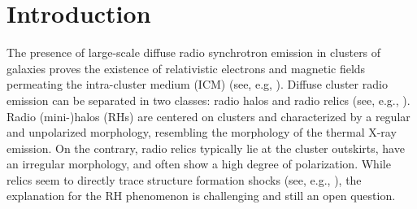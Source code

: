 \documentclass[traditabstract]{aa}
\begin{document}



\maketitle


\section{Introduction}
\label{sec:1}

\begingroup
\let\thefootnote\relax{}
\let\thefootnote\relax{}
\endgroup

The presence of large-scale diffuse radio synchrotron emission in clusters of
galaxies proves the existence of relativistic electrons and magnetic fields
permeating the intra-cluster medium (ICM) (see,
e.g, \citealp{2004NewAR..48.1137F}).  Diffuse cluster radio emission can be
separated in two classes: radio halos and radio relics (see,
e.g., \citealp{2004rcfg.procE..25K,2008SSRv..134...93F}).  Radio
\mbox{(mini-)}halos (RHs) are centered on clusters and characterized by a
regular and unpolarized morphology, resembling the morphology of the thermal
X-ray emission. On the contrary, radio relics typically lie at the cluster
outskirts, have an irregular morphology, and often show a high degree of
polarization. While relics seem to directly trace structure formation shocks
(see, e.g., \citealp{2011A&A...533A..35V}), the explanation for the RH phenomenon
is challenging and still an open question.
                                   
\end{document}
